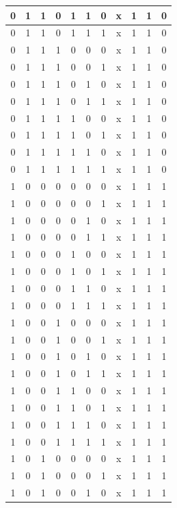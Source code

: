 \documentclass[conference]{IEEEtran}
\begin{document}
\begin{table}[htbp]
\begin{center}
\begin{tabular}{|c|c|c|c|c|c|c|c|c|c|c|}
\hline
0 & 1 & 1 & 0 & 1 & 1 & 0 & x & 1 & 1 & 0 \\
\hline
0 & 1 & 1 & 0 & 1 & 1 & 1 & x & 1 & 1 & 0 \\
\hline
0 & 1 & 1 & 1 & 0 & 0 & 0 & x & 1 & 1 & 0 \\
\hline
0 & 1 & 1 & 1 & 0 & 0 & 1 & x & 1 & 1 & 0 \\
\hline
0 & 1 & 1 & 1 & 0 & 1 & 0 & x & 1 & 1 & 0 \\
\hline
0 & 1 & 1 & 1 & 0 & 1 & 1 & x & 1 & 1 & 0 \\
\hline
0 & 1 & 1 & 1 & 1 & 0 & 0 & x & 1 & 1 & 0 \\
\hline
0 & 1 & 1 & 1 & 1 & 0 & 1 & x & 1 & 1 & 0 \\
\hline
0 & 1 & 1 & 1 & 1 & 1 & 0 & x & 1 & 1 & 0 \\
\hline
0 & 1 & 1 & 1 & 1 & 1 & 1 & x & 1 & 1 & 0 \\
\hline
1 & 0 & 0 & 0 & 0 & 0 & 0 & x & 1 & 1 & 1 \\
\hline
1 & 0 & 0 & 0 & 0 & 0 & 1 & x & 1 & 1 & 1 \\
\hline
1 & 0 & 0 & 0 & 0 & 1 & 0 & x & 1 & 1 & 1 \\
\hline
1 & 0 & 0 & 0 & 0 & 1 & 1 & x & 1 & 1 & 1 \\
\hline
1 & 0 & 0 & 0 & 1 & 0 & 0 & x & 1 & 1 & 1 \\
\hline
1 & 0 & 0 & 0 & 1 & 0 & 1 & x & 1 & 1 & 1 \\
\hline
1 & 0 & 0 & 0 & 1 & 1 & 0 & x & 1 & 1 & 1 \\
\hline
1 & 0 & 0 & 0 & 1 & 1 & 1 & x & 1 & 1 & 1 \\
\hline
1 & 0 & 0 & 1 & 0 & 0 & 0 & x & 1 & 1 & 1 \\
\hline
1 & 0 & 0 & 1 & 0 & 0 & 1 & x & 1 & 1 & 1 \\
\hline
1 & 0 & 0 & 1 & 0 & 1 & 0 & x & 1 & 1 & 1 \\
\hline
1 & 0 & 0 & 1 & 0 & 1 & 1 & x & 1 & 1 & 1 \\
\hline
1 & 0 & 0 & 1 & 1 & 0 & 0 & x & 1 & 1 & 1 \\
\hline
1 & 0 & 0 & 1 & 1 & 0 & 1 & x & 1 & 1 & 1 \\
\hline
1 & 0 & 0 & 1 & 1 & 1 & 0 & x & 1 & 1 & 1 \\
\hline
1 & 0 & 0 & 1 & 1 & 1 & 1 & x & 1 & 1 & 1 \\
\hline
1 & 0 & 1 & 0 & 0 & 0 & 0 & x & 1 & 1 & 1 \\
\hline
1 & 0 & 1 & 0 & 0 & 0 & 1 & x & 1 & 1 & 1 \\
\hline
1 & 0 & 1 & 0 & 0 & 1 & 0 & x & 1 & 1 & 1 \\

\end{tabular}
\end{center}
\end{table}
\end{document}
